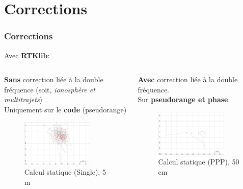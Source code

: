 \documentclass[xcolor=dvipsnames,envcountsect]{beamer}
\begin{document}
\section{Corrections}
\begin{frame}
	\frametitle{Corrections}
	Avec \textbf{RTKlib}:
	\newline
	\begin{columns}
		\begin{column}{0.5\textwidth}
			{\small \textbf{Sans} correction liée à la double fréquence (soit, \textit{ionosphère et multitrajets})\\
			Uniquement sur le \textbf{code} (pseudorange)}
			\begin{figure}
				\centering
				\includegraphics[width=0.8\textwidth]{./Figures/single_city.jpg}
				\caption {Calcul statique (Single), 5 m}
			\end{figure}
		\end{column}

		\begin{column}{0.5\textwidth}
			{\small \textbf{Avec} correction liée à la double fréquence.\\
			Sur \textbf{pseudorange et phase}.}
			\begin{figure}
				\centering
				\includegraphics[width=0.8\textwidth]{./Figures/ppp_city.jpg}
				\caption {Calcul statique (PPP), 50 cm}
			\end{figure}
		\end{column}
	\end{columns}

\end{frame}
\end{document}
